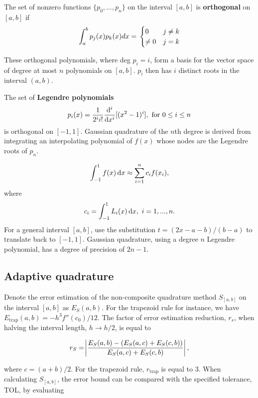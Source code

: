 \begin{definition}
The set of nonzero functions $\{p_0,...,p_n\}$ on the interval $[a,b]$ is \textbf{orthogonal} on $[a,b]$ if
$$
\int_a^b p_j(x)p_k(x)dx = \\
\begin{cases}
    0 & j \neq k \\
    \neq 0 & j = k
\end{cases}
$$
\end{definition}

\begin{theorem}
These orthogonal polynomials, where deg $p_i = i$, form a basis for the vector space of degree at most $n$ polynomials on $[a,b]$. $p_i$ then has $i$ distinct roots in the interval $(a,b)$.
\end{theorem}

The set of \textbf{Legendre polynomials}
$$
p_i(x) = \frac{1}{2^i i!}\frac{\mathop{}\!\mathrm{d}{}^i}{\mathop{}\!\mathrm{d}{x}^i}[(x^2-1)^i], \text{ for } 0 \leq i \leq n
$$
is orthogonal on $[-1,1]$. 
\vspace{2mm}
\newline
Gaussian quadrature of the $n$th degree is derived from integrating an interpolating polynomial of $f(x)$ whose nodes are the Legendre roots of $p_n$.

$$
\int_{-1}^1 f(x) \mathop{}\!\mathrm{d}{x} \approx \sum_{i=1}^n c_i f(x_i),
$$
where
$$
c_i = \int_{-1}^1 L_i(x) \mathop{}\!\mathrm{d}{x}, \text{    } i = 1,..., n.
$$
For a general interval $[a,b]$, use the substitution $t=(2x-a-b)/(b-a)$ to translate back to $[-1,1]$. Gaussian quadrature, using a degree $n$ Legendre polynomial, has a degree of precision of $2n-1$.

\subsection{Adaptive quadrature}
Denote the error estimation of the non-composite quadrature method $S_{[a,b]}$ on the interval $[a,b]$ as $E_S(a,b)$. For the trapezoid rule for instance, we have $E_{\text{trap}}(a,b) = -h^3 f''(c_0)/12$. The factor of error estimation reduction, $r_s$, when halving the interval length, $h \to h/2$, is equal to

$$
r_S = \abs{\frac{E_S(a,b) - (E_S(a,c) + E_S(c,b))}{E_S(a,c) + E_S(c,b)}},
$$

where $c=(a+b)/2$. For the trapezoid rule, $r_{\text{trap}}$ is equal to 3. When calculating $S_{[a,b]}$, the error bound can be compared with the specified tolerance, TOL, by evaluating 

